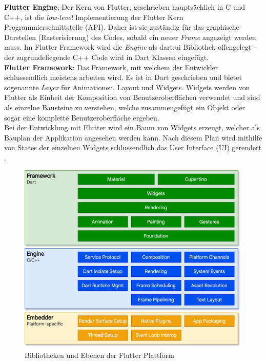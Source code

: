 \noindent
{}
\textbf{Flutter Engine}: Der Kern von Flutter, geschrieben hauptsächlich in C und C++, ist die \textit{low-level} Implementierung der Flutter Kern Programmierschnittstelle (API). Daher ist sie zuständig für das graphische Darstellen (Rasterisierung) des Codes, sobald ein neuer \textit{Frame} angezeigt werden muss. Im Flutter Framework wird die \textit{Engine} als dart:ui Bibliothek offengelegt - der zugrundeliegende C++ Code wird in Dart Klassen eingefügt.\\

\noindent
{}
\textbf{Flutter Framework}: Das Framework, mit welchem der Entwickler schlussendlich meistens arbeiten wird. Es ist in Dart geschrieben und bietet sogenannte \textit{Layer} für Animationen, Layout und Widgets. Widgets werden von Flutter als Einheit der Komposition von Benutzeroberflächen verwendet und sind als einzelne Bausteine zu verstehen, welche zusammengefügt ein Objekt oder sogar eine komplette Benutzeroberfläche ergeben.\\

\noindent
Bei der Entwicklung mit Flutter wird ein Baum von Widgets erzeugt, welcher als Bauplan der Applikation angesehen werden kann. Nach diesem Plan wird mithilfe von States der einzelnen Widgets schlussendlich das User Interface (UI) gerendert \cite{flutter2021}.

\begin{figure}[tbt]
	\begin{center}
		\includegraphics[scale=0.25]{Theoretische_Grundlagen/images/flutter_architektur.png}
	\end{center}
	\caption[Bibliotheken und Ebenen der Flutter Plattform]{Bibliotheken und Ebenen der Flutter Plattform \protect \footnotemark}
	\label{fig:flutter_plattform}
\end{figure}

